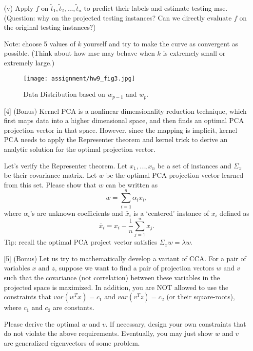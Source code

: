 \documentclass{llncs}
\begin{document}
(v) Apply $f$ on $\tilde{t}_{1}, \tilde{t}_{2}, \ldots, \tilde{t}_{n}$ 
to predict their labels and estimate 
testing mse. (Question: 
why on the projected testing instances? 
Can we directly evaluate $f$ on the
original testing instances?) 

Note: choose 5 values of $k$ yourself 
and try to make the curve as convergent 
as possible. (Think about how mse may 
behave when $k$ is extremely small or 
extremely large.) 


\begin{figure}[h!] 
\centering 
\texttt{[image: assignment/hw9\_fig3.jpg]} 
\caption{Data Distribution based 
on $w_{p-1}$ and $w_{p}$.} 
\label{hw9_fig3}
\end{figure}

\newpage 

[4] (Bonus) 
Kernel PCA is a nonlinear dimensionality reduction technique, which first maps 
data into a higher dimensional space, 
and then finds an optimal PCA projection
vector in that space. However, since 
the mapping is implicit, kernel PCA needs
to apply the Representer theorem and kernel
trick to derive an analytic solution 
for the optimal projection vector. 

Let's verify the Representer theorem. 
Let $x_{1}, \ldots, x_{n}$ be a set 
of instances and $\Sigma_{x}$ be their 
covariance matrix. Let $w$ be the optimal 
PCA projection vector learned from 
this set. Please show that $w$ can 
be written as 
\begin{equation}
w = \sum_{i = 1}^{n} \alpha_{i} 
\bar{x}_{i}, 
\end{equation}
where $\alpha_{i}$'s are unknown
coefficients and $\bar{x}_{i}$ 
is a `centered' instance of $x_{i}$ 
defined as 
\begin{equation}
\bar{x}_{i} = x_{i} -
\frac{1}{n}\sum_{j=1}^{n} x_{j}. 
\end{equation}
Tip: recall the optimal PCA project 
vector satisfies 
$\Sigma_{x} w = \lambda w$.

\newpage 

[5] (Bonus) Let us try to mathematically 
develop a variant of CCA. For a pair of 
variables $x$ and $z$, suppose we want 
to find a pair of projection vectors 
$w$ and $v$ such that the covariance 
(not correlation) between these variables
in the projected space  is maximized. 
In addition, you are NOT allowed to use 
the constraints that 
$var(w^{T}x) = c_{1}$ and 
$var(v^{T}z) = c_{2}$ (or their 
square-roots), where $c_{1}$ and $c_{2}$ 
are constants. 

Please derive the optimal $w$ and 
$v$. If necessary, design 
your own constraints that do not 
violate the above requirements. 
Eventually, you may just show $w$ 
and $v$ are generalized eigenvectors 
of some problem. 
\end{document}
